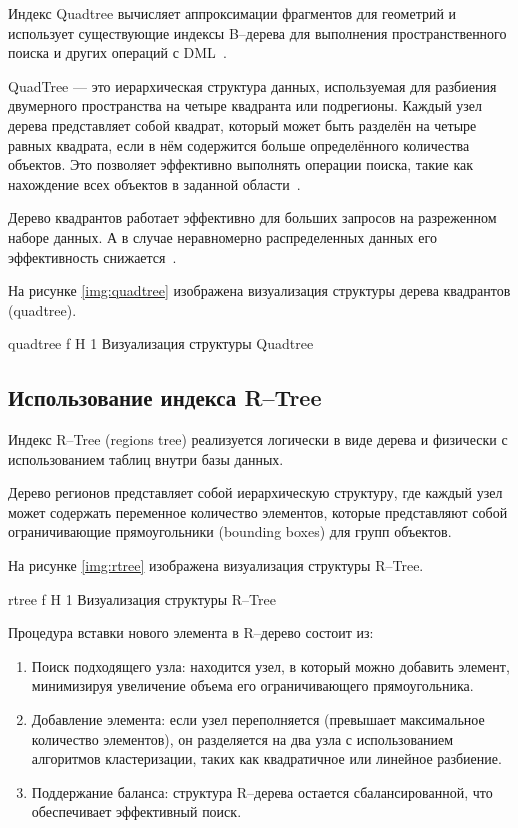 Индекс Quadtree вычисляет аппроксимации фрагментов для геометрий и использует существующие индексы B--дерева для выполнения пространственного поиска и других операций с DML~\cite{quadtree}.

QuadTree — это иерархическая структура данных, используемая для разбиения двумерного пространства на четыре квадранта или подрегионы.
Каждый узел дерева представляет собой квадрат, который может быть разделён на четыре равных квадрата, если в нём содержится больше определённого количества объектов.
Это позволяет эффективно выполнять операции поиска, такие как нахождение всех объектов в заданной области~\cite{shekhar2003spatial}.

Дерево квадрантов работает эффективно для больших запросов на разреженном наборе данных.
А в случае неравномерно распределенных данных его эффективность снижается~\cite{unevenly-distributed}.

На рисунке \ref{img:quadtree} изображена визуализация структуры дерева квадрантов (quadtree).

{quadtree}
{f}
{H}
{1\textwidth}
{Визуализация структуры Quadtree}

\subsection{Использование индекса R--Tree}

Индекс R--Tree (regions tree) реализуется логически в виде дерева и физически с использованием таблиц внутри базы данных.

Дерево регионов представляет собой иерархическую структуру, где каждый узел может содержать переменное количество элементов, которые представляют собой ограничивающие прямоугольники (bounding boxes) для групп объектов.

На рисунке \ref{img:rtree} изображена визуализация структуры R--Tree.

{rtree}
{f}
{H}
{1\textwidth}
{Визуализация структуры R--Tree}

Процедура вставки нового элемента в R--дерево состоит из:
\begin{enumerate}
    \item Поиск подходящего узла: находится узел, в который можно добавить элемент, минимизируя увеличение объема его ограничивающего прямоугольника.
    \item Добавление элемента: если узел переполняется (превышает максимальное количество элементов), он разделяется на два узла с использованием алгоритмов кластеризации, таких как квадратичное или линейное разбиение.
    \item Поддержание баланса: структура R--дерева остается сбалансированной, что обеспечивает эффективный поиск.
\end{enumerate}

